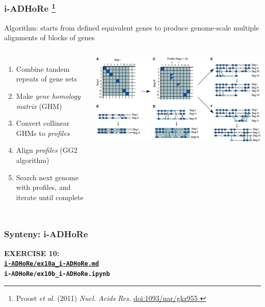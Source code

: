 %
\begin{frame}
  \frametitle{i-ADHoRe
    \footnote{\tiny{Proost \textit{et al}. (2011) \textit{Nucl. Acids Res.} \href{http://dx.doi.org/10..1093/nar/gkr955}{doi:1093/nar/gkr955
  }}}
}
  Algorithm: starts from defined equivalent genes to produce genome-scale multiple alignments of blocks of genes
  {\small
  \begin{columns}[T] 
      \begin{enumerate}
        \item Combine tandem repeats of gene sets
        \item Make \textcolor{hutton_green}{\textit{gene homology matrix} (GHM)}
        \item Convert collinear GHMs to \textcolor{hutton_blue}{\textit{profiles}}
        \item Align \textit{profiles} (GG2 algorithm)
        \item Search next genome with profiles, and \textcolor{hutton_purple}{iterate until complete}
      \end{enumerate}  
        \includegraphics[width=\textwidth]{images/i-adhore_algorithm}
    \end{columns}
    }    
\end{frame}

%
\begin{frame}
  \frametitle{Synteny: i-ADHoRe}
  \Large{
    \textcolor{hutton_blue}{
      \textbf{
      EXERCISE 10: \\
{\small \href{https://github.com/widdowquinn/Teaching-2015-03-17-UoD_compgenvis/blob/master/exercises/i-ADHoRe/ex10a_i-ADHoRe.md}{\texttt{i-ADHoRe/ex10a\_i-ADHoRe.md}} \\
      \texttt{i-ADHoRe/ex10b\_i-ADHoRe.ipynb}}
      }
    }
  }
\end{frame}

